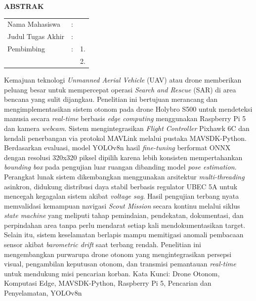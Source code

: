 \begin{center}
	\large\textbf{ABSTRAK}
\end{center}


\vspace{2ex}
\begingroup
\setlength{\tabcolsep}{0pt}

\noindent
\begin{tabularx}{\textwidth}{l >{\centering}m{2em} X}
	Nama Mahasiswa    & : & \name{}         \\
	
	Judul Tugas Akhir & : & \tatitle{}      \\
	
	Pembimbing        & : & 1. \advisor{}   \\
	&   & 2. \coadvisor{} \\
\end{tabularx} 
\endgroup

Kemajuan teknologi \textit{Unmanned Aerial Vehicle} (UAV) atau drone memberikan peluang besar untuk mempercepat operasi \textit{Search and Rescue} (SAR) di area bencana yang sulit dijangkau. Penelitian ini bertujuan merancang dan mengimplementasikan sistem otonom pada drone Holybro S500 untuk mendeteksi manusia secara \textit{real-time} berbasis \textit{edge computing} menggunakan Raspberry Pi 5 dan kamera \textit{webcam}. Sistem mengintegrasikan \textit{Flight Controller} Pixhawk 6C dan kendali penerbangan via protokol MAVLink melalui pustaka MAVSDK-Python. Berdasarkan evaluasi, model YOLOv8n hasil \textit{fine-tuning} berformat ONNX dengan resolusi 320x320 piksel dipilih karena lebih konsisten mempertahankan \textit{bounding box} pada pengujian luar ruangan dibanding model \textit{pose estimation}. Perangkat lunak sistem dikembangkan menggunakan arsitektur \textit{multi-threading} asinkron, didukung distribusi daya stabil berbasis regulator UBEC 5A untuk mencegah kegagalan sistem akibat \textit{voltage sag}. Hasil pengujian terbang nyata memvalidasi kemampuan navigasi \textit{Scout Mission} secara kontinu melalui siklus \textit{state machine} yang meliputi tahap pemindaian, pendekatan, dokumentasi, dan perpindahan area tanpa perlu mendarat setiap kali mendokumentasikan target. Selain itu, sistem keselamatan berlapis mampu memitigasi anomali pembacaan sensor akibat \textit{barometric drift} saat terbang rendah. Penelitian ini mengembangkan purwarupa drone otonom yang mengintegrasikan persepsi visual, pengambilan keputusan otonom, dan transmisi pemantauan \textit{real-time} untuk mendukung misi pencarian korban.
Kata Kunci: Drone Otonom, Komputasi Edge, MAVSDK-Python, Raspberry Pi 5, Pencarian dan Penyelamatan, YOLOv8n